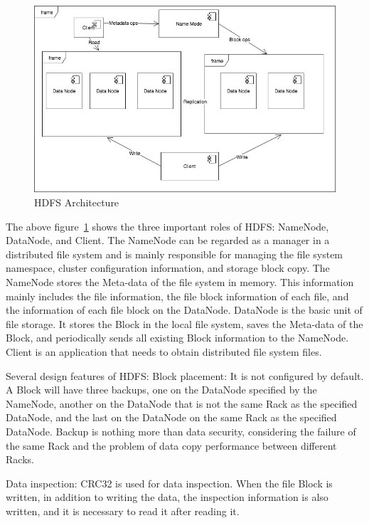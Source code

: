 \begin{figure}[!ht]
  \centering\includegraphics[width=\columnwidth]{../images/HDFS.jpg}
  \caption{HDFS Architecture}\label{f:hdfs}
\end{figure}


The above figure~\ref{f:hdfs} shows the three important roles of HDFS: NameNode, DataNode, and Client. The NameNode can be regarded as a manager in a distributed file system and is mainly responsible for managing the file system namespace, cluster configuration information, and storage block copy. The NameNode stores the Meta-data of the file system in memory. This information mainly includes the file information, the file block information of each file, and the information of each file block on the DataNode. DataNode is the basic unit of file storage. It stores the Block in the local file system, saves the Meta-data of the Block, and periodically sends all existing Block information to the NameNode. Client is an application that needs to obtain distributed file system files. 

Several design features of HDFS:
Block placement: It is not configured by default. A Block will have three backups, one on the DataNode specified by the NameNode, another on the DataNode that is not the same Rack as the specified DataNode, and the last on the DataNode on the same Rack as the specified DataNode. Backup is nothing more than data security, considering the failure of the same Rack and the problem of data copy performance between different Racks.


Data inspection: CRC32 is used for data inspection. When the file Block is written, in addition to writing the data, the inspection information is also written, and it is necessary to read it after reading it.


